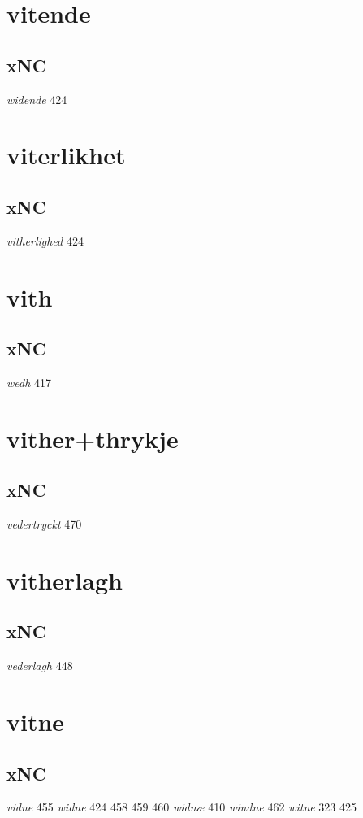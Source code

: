 \documentclass[a4paper,twocolumn]{article}
\begin{document}
\section{vitende}
\label{sec:org9342762}
\subsection{xNC}
\label{sec:org41e9c88}
\emph{widende} 424 
\section{viterlikhet}
\label{sec:org3bbb31d}
\subsection{xNC}
\label{sec:org7ce31c9}
\emph{vitherlighed} 424 
\section{vith}
\label{sec:org53ebf61}
\subsection{xNC}
\label{sec:orgf4e45ea}
\emph{wedh} 417 
\section{vither+thrykje}
\label{sec:org3c2d793}
\subsection{xNC}
\label{sec:org61bf0ae}
\emph{vedertryckt} 470 
\section{vitherlagh}
\label{sec:orgfa3d20b}
\subsection{xNC}
\label{sec:orgf9b1660}
\emph{vederlagh} 448 
\section{vitne}
\label{sec:orgf637727}
\subsection{xNC}
\label{sec:org3ea9e63}
\emph{vidne} 455 \emph{widne} 424 458 459 460 \emph{widnæ} 410 \emph{windne} 462 \emph{witne} 323 425 
\end{document}
